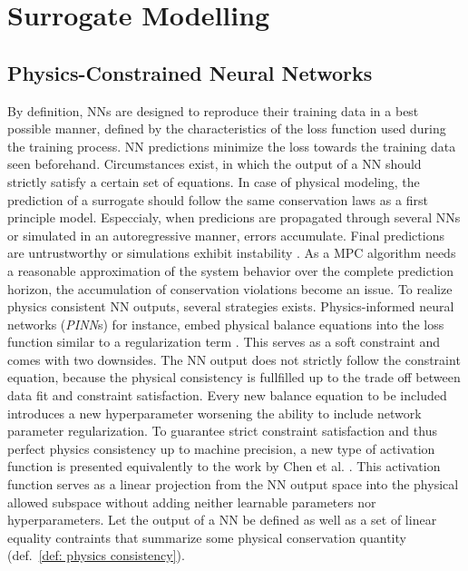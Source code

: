\chapter{Surrogate Modelling}

\section{Physics-Constrained Neural Networks}
By definition, NNs are designed to reproduce their training data in a best possible manner, defined by the characteristics of the loss
function used during the training process. NN predictions minimize the loss towards the training data seen beforehand.
Circumstances exist, in which the output of a NN should strictly satisfy a certain set of equations. In case of
physical modeling, the prediction of a surrogate should follow the same conservation laws as a first principle model. Especcialy,
when predicions are propagated through several NNs or simulated in an autoregressive manner, errors accumulate. 
Final predictions are untrustworthy or simulations exhibit instability \cite{chen2024}. As a MPC algorithm needs a reasonable
approximation of the system behavior over the complete prediction horizon, the accumulation of conservation violations
become an issue.
\newline
\newline
To realize physics consistent NN outputs, several strategies exists. Physics-informed neural networks (\emph{PINN}s) for instance,
embed physical balance equations into the loss function similar to a regularization term \cite{raissi2019}. This serves as a 
soft constraint and comes with two downsides.
The NN output does not strictly follow the constraint equation, because the physical consistency is fullfilled up to
the trade off between data fit and constraint satisfaction.
Every new balance equation to be included introduces a new hyperparameter worsening the ability to include network parameter regularization.
To guarantee strict constraint satisfaction and thus perfect physics consistency up to machine precision,
a new type of activation function is presented equivalently to the work by Chen et al. \cite{chen2024}. This activation function serves as a linear projection from the NN output space
into the physical allowed subspace without adding neither learnable parameters nor hyperparameters.
Let the output of a NN be defined as well as a set of linear equality contraints that summarize some physical conservation quantity (def.~\ref{def: physics consistency}).


